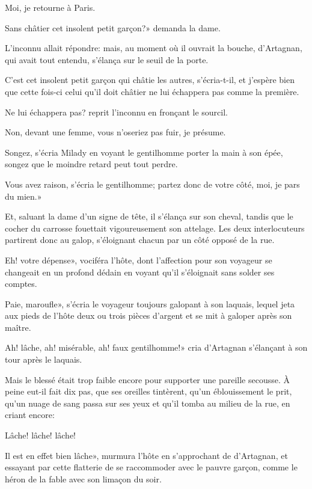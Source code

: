 \speak  Moi, je retourne à Paris. 

\speak  Sans châtier cet insolent petit garçon?» demanda la dame. 

L'inconnu allait répondre: mais, au moment où il ouvrait la bouche, d'Artagnan, qui avait tout entendu, s'élança sur le seuil de la porte. 

\speak  C'est cet insolent petit garçon qui châtie les autres, s'écria-t-il, et j'espère bien que cette fois-ci celui qu'il doit châtier ne lui échappera pas comme la première. 

\speak  Ne lui échappera pas? reprit l'inconnu en fronçant le sourcil. 

\speak  Non, devant une femme, vous n'oseriez pas fuir, je présume. 

\speak  Songez, s'écria Milady en voyant le gentilhomme porter la main à son épée, songez que le moindre retard peut tout perdre. 

\speak  Vous avez raison, s'écria le gentilhomme; partez donc de votre côté, moi, je pars du mien.» 

Et, saluant la dame d'un signe de tête, il s'élança sur son cheval, tandis que le cocher du carrosse fouettait vigoureusement son attelage. Les deux interlocuteurs partirent donc au galop, s'éloignant chacun par un côté opposé de la rue. 

\speak  Eh! votre dépense», vociféra l'hôte, dont l'affection pour son voyageur se changeait en un profond dédain en voyant qu'il s'éloignait sans solder ses comptes. 

\speak  Paie, maroufle», s'écria le voyageur toujours galopant à son laquais, lequel jeta aux pieds de l'hôte deux ou trois pièces d'argent et se mit à galoper après son maître. 

\speak  Ah! lâche, ah! misérable, ah! faux gentilhomme!» cria d'Artagnan s'élançant à son tour après le laquais. 

Mais le blessé était trop faible encore pour supporter une pareille secousse. À peine eut-il fait dix pas, que ses oreilles tintèrent, qu'un éblouissement le prit, qu'un nuage de sang passa sur ses yeux et qu'il tomba au milieu de la rue, en criant encore: 

\speak  Lâche! lâche! lâche! 

\speak  Il est en effet bien lâche», murmura l'hôte en s'approchant de d'Artagnan, et essayant par cette flatterie de se raccommoder avec le pauvre garçon, comme le héron de la fable avec son limaçon du soir. 


